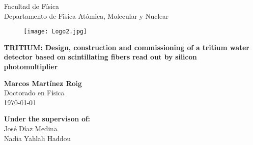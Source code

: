 \begin{titlepage}

\begin{center}


{\large Facultad de Física}\\
{\large Departamento de Fisica Atómica, Molecular y Nuclear}\\
\vspace*{0.2in}
\vspace*{0.6in}
\end{center}
\vspace*{-1in}
\begin{center}
\vspace*{1 cm}


\begin{figure}[htb]
\begin{center}
\texttt{[image: Logo2.jpg]} 
\end{center}
\end{figure}
\vspace*{1 cm}

\begin{large}

\end{large}
\begin{Large}
\textbf{\LARGE TRITIUM: Design, construction and commissioning of a tritium water detector based on scintillating fibers read out by silicon photomultiplier} \\
\end{Large}
\vspace*{1.2 cm}

\begin{large}
\textbf{Marcos Martínez Roig}\\
Doctorado en Física\\
\today
\end{large}
\end{center}

\vspace*{-1.2 cm}
\begin{large}
\begin{flushright}
\item[\bf Under the supervison of:]\quad  \\ 
José Díaz Medina\\
Nadia Yahlali Haddou\\
\end{flushright}
\end{large}

\end{titlepage}
